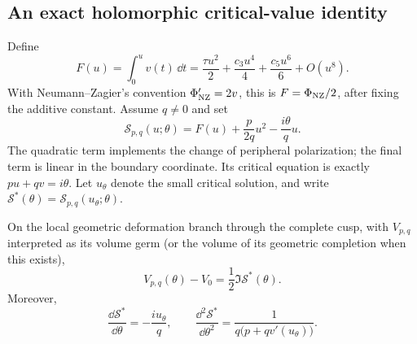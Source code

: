 \subsection{An exact holomorphic critical-value identity}

Define
\begin{equation}
 F(u)=\int_0^u v(t)\,\dd t
     =\frac{\tau u^2}{2}+\frac{c_3u^4}{4}
        +\frac{c_5u^6}{6}+O(u^8).
 \label{eq:dehnprimitive}
\end{equation}
With Neumann--Zagier's convention $\Phi_{\rm NZ}'=2v$,
this is $F=\Phi_{\rm NZ}/2$, after fixing the additive constant.
Assume $q\ne0$ and set
\begin{equation}
 \boxed{
 \mathcal S_{p,q}(u;\theta)
       =F(u)+\frac{p}{2q}u^2-\frac{i\theta}{q}u.}
 \label{eq:dehnsurgeryaction}
\end{equation}
The quadratic term implements the change of peripheral polarization;
the final term is linear in the boundary coordinate. Its critical
equation is exactly $pu+qv=i\theta$. Let $u_\theta$ denote the small
critical solution, and write
$\mathcal S^*(\theta)=\mathcal S_{p,q}(u_\theta;\theta)$.

\begin{proposition}
\label{prop:dehncriticalvalue}
On the local geometric deformation branch through the complete cusp,
with $V_{p,q}$ interpreted as its volume germ (or the volume of its
geometric completion when this exists),
\begin{equation}
 \boxed{V_{p,q}(\theta)-V_0=\frac12\Im\mathcal S^*(\theta).}
 \label{eq:dehnexactcriticalvolume}
\end{equation}
Moreover,
\begin{equation}
 \frac{\dd\mathcal S^*}{\dd\theta}=-\frac{i u_\theta}{q},\qquad
 \frac{\dd^2\mathcal S^*}{\dd\theta^2}
       =\frac{1}{q\bigl(p+qv'(u_\theta)\bigr)}.
 \label{eq:dehnenvelope}
\end{equation}
\end{proposition}

